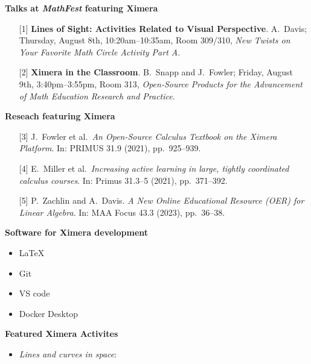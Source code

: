 \documentclass[twocolumn]{article}
\begin{document}
    \begin{xframe}
        {\sffamily\bfseries Talks at \textsl{MathFest} featuring Ximera}
        \begin{itemize}
            \item[{[1]}] \textbf{Lines of Sight: Activities Related to Visual
                Perspective}. A.\ Davis; Thursday, August 8th,
            10:20am--10:35am,
            Room 309/310,
            \textit{New Twists on Your Favorite Math Circle Activity Part A}.
            \item[{[2]}] \textbf{Ximera in the Classroom}. B.\ Snapp and J.\
            Fowler;
            Friday, August 9th, 3:40pm--3:55pm, Room 313, \textit{Open-Source
                Products for
                the Advancement of Math Education Research and Practice}.
        \end{itemize}
    \end{xframe}

    \begin{xframe}
        {\sffamily\bfseries Reseach featuring Ximera}
        \begin{itemize}
            \item[{[3]}] J.\ Fowler et al.\ \textit{An Open-Source Calculus
                Textbook on the Ximera Platform}. In:
            PRIMUS 31.9 (2021), pp.\ 925--939. %
            \item[{[4]}] E.\ Miller et al.\ \textit{Increasing active learning
                in large, tightly coordinated
                calculus courses}.
            In: Primus 31.3--5 (2021), pp.\ 371--392.
            \item[{[5]}] P.\ Zachlin and A.\ Davis. \textit{A New Online
                Educational Resource (OER)
                for Linear Algebra}. In: MAA Focus 43.3 (2023), pp.\ 36--38.
        \end{itemize}
    \end{xframe}

    \begin{xframe}
        {\sffamily\bfseries Software for Ximera development}
        \begin{itemize}
            \item \LaTeX\
            \item Git
            \item VS code
            \item Docker Desktop
        \end{itemize}
    \end{xframe}


\begin{xframe}
        {\sffamily\bfseries Featured Ximera Activites}
        \begin{itemize}
            \item \textit{Lines and curves in space}: 
        \end{itemize}
    \end{xframe}
\end{document}
